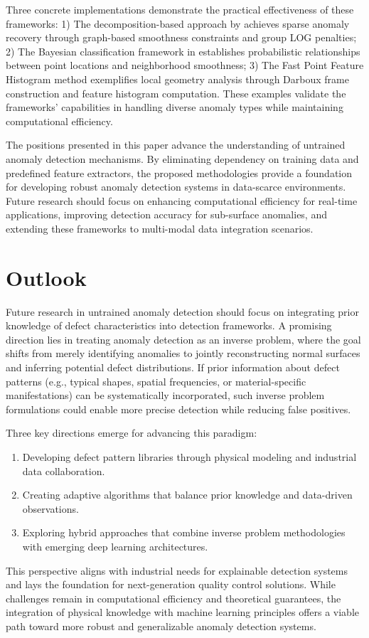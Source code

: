 Three concrete implementations demonstrate the practical effectiveness of these frameworks: 1) The decomposition-based approach by \cite{tao2025pointsgrade} achieves sparse anomaly recovery through graph-based smoothness constraints and group LOG penalties; 2) The Bayesian classification framework in \cite{tao2023anomaly} establishes probabilistic relationships between point locations and neighborhood smoothness; 3) The Fast Point Feature Histogram method \cite{rusu2009fast} exemplifies local geometry analysis through Darboux frame construction and feature histogram computation. These examples validate the frameworks' capabilities in handling diverse anomaly types while maintaining computational efficiency.

The positions presented in this paper advance the understanding of untrained anomaly detection mechanisms. By eliminating dependency on training data and predefined feature extractors, the proposed methodologies provide a foundation for developing robust anomaly detection systems in data-scarce environments. Future research should focus on enhancing computational efficiency for real-time applications, improving detection accuracy for sub-surface anomalies, and extending these frameworks to multi-modal data integration scenarios.


\section{Outlook}
\label{sec:outlook}

Future research in untrained anomaly detection should focus on integrating prior knowledge of defect characteristics into detection frameworks. A promising direction lies in treating anomaly detection as an inverse problem, where the goal shifts from merely identifying anomalies to jointly reconstructing normal surfaces and inferring potential defect distributions. If prior information about defect patterns (e.g., typical shapes, spatial frequencies, or material-specific manifestations) can be systematically incorporated, such inverse problem formulations could enable more precise detection while reducing false positives.

Three key directions emerge for advancing this paradigm:
\begin{enumerate}[itemsep=1pt]
    \item Developing defect pattern libraries through physical modeling and industrial data collaboration.
    \item Creating adaptive algorithms that balance prior knowledge and data-driven observations.
    \item Exploring hybrid approaches that combine inverse problem methodologies with emerging deep learning architectures.
\end{enumerate}
This perspective aligns with industrial needs for explainable detection systems and lays the foundation for next-generation quality control solutions. While challenges remain in computational efficiency and theoretical guarantees, the integration of physical knowledge with machine learning principles offers a viable path toward more robust and generalizable anomaly detection systems.

